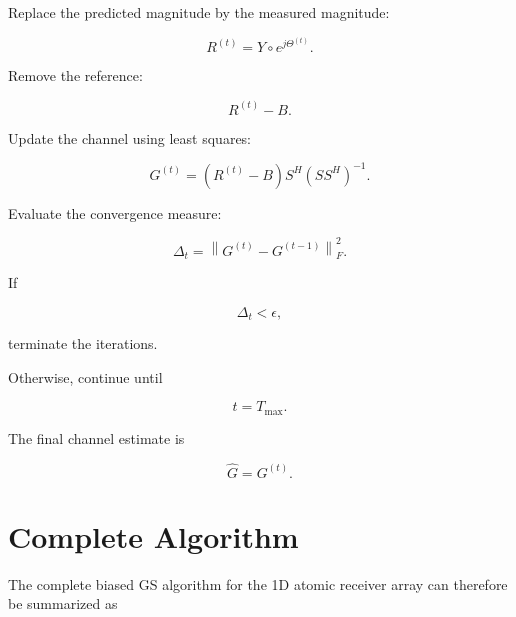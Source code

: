 \documentclass[12pt,a4paper]{article}
\begin{document}
Replace the predicted magnitude by the measured magnitude:

\begin{equation}
\boxed{
R^{(t)}
=
Y\circ e^{j\Theta^{(t)}}
}.
\tag{362}
\end{equation}

Remove the reference:

\begin{equation}
\boxed{
R^{(t)}-B
}.
\tag{363}
\end{equation}

Update the channel using least squares:

\begin{equation}
\boxed{
G^{(t)}
=
(R^{(t)}-B)
S^H
(SS^H)^{-1}
}.
\tag{364}
\end{equation}

Evaluate the convergence measure:

\begin{equation}
\boxed{
\Delta_t
=
\left\|
G^{(t)}
-
G^{(t-1)}
\right\|_F^2
}.
\tag{365}
\end{equation}

If

\begin{equation}
\boxed{
\Delta_t<\epsilon,
}
\tag{366}
\end{equation}

terminate the iterations.

Otherwise, continue until

\begin{equation}
t=T_{\max}.
\tag{367}
\end{equation}

The final channel estimate is

\begin{equation}
\boxed{
\widehat G=G^{(t)}
}.
\tag{368}
\end{equation}

\clearpage
\section{Complete Algorithm}

The complete biased GS algorithm for the 1D atomic receiver array can therefore be summarized as
\end{document}
